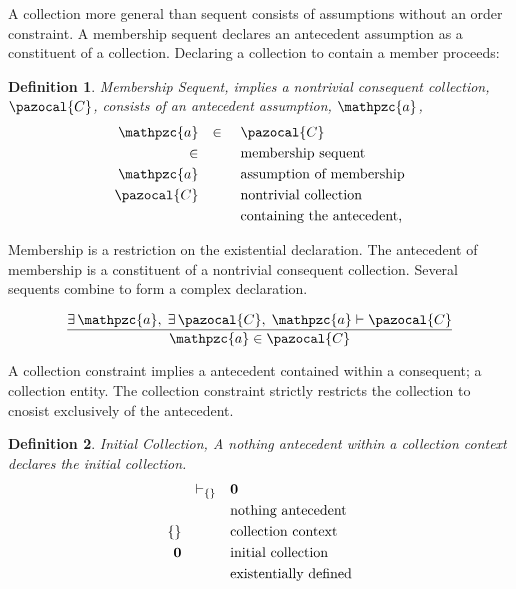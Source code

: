 \documentclass[aps,twocolumn,secnumarabic,nobalancelastpage,amsmath,amssymb,
amsthm,nofootinbib,parskip=full]{revtex4}
\numberwithin{equation}{section}
\newtheorem{definition}{Definition}[section]
\newcommand{\obk}[1]{\mathpzc{#1}}
\newcommand{\cat}[1]{\pazocal{#1}}
\newcommand{\catN}[1]{\mathbf{\large #1}}
\begin{document}
A collection more general than sequent consists of
assumptions without an order constraint.
A membership sequent declares an antecedent assumption as a
constituent of a collection.
Declaring a collection to contain a member proceeds:

\begin{definition}{Membership Sequent}\label{def:membership},
  implies a nontrivial consequent collection, $\cat{C}$,
  consists of an antecedent assumption, $\obk{a}$,
  \begin{equation*}
  \begin{array}{rll}
   \obk{a}&\in&\cat{C} \\[3pt]
   \in&\quad&\text{membership sequent} \\[3pt]
   \obk{a}&\quad&\text{assumption of membership} \\[3pt]
   \cat{C}&\quad&\text{nontrivial collection} \\[3pt]
   &&\text{containing the antecedent,}
  \end{array}
  \end{equation*}
\end{definition}

Membership is a restriction on the existential declaration.
The antecedent of membership is a constituent of a
nontrivial consequent collection.
Several sequents combine to form a complex declaration.

\begin{equation*}
\frac{\exists\,\obk{a},\;\exists\,\cat{C},\;\obk{a}\vdash\cat{C}}
{\obk{a}\in\cat{C}}
\end{equation*}  

A collection constraint implies a antecedent contained within a consequent; a
collection entity. The collection constraint strictly restricts the collection
to cnosist exclusively of the antecedent.

\begin{definition}{Initial Collection}\label{def:initialcollection},
  A nothing antecedent within a collection context declares the
  initial collection.
  \begin{equation*}
  \begin{array}{rll}
   &\vdash_{\{\}}&\catN{0} \\[3pt]
   &\quad&\text{nothing antecedent} \\[3pt]
   \{\}&\quad&\text{collection context} \\[3pt]
   \catN{0}&\quad&\text{initial collection} \\[3pt]
    &&\text{existentially defined}
  \end{array}
  \end{equation*}
\end{definition}
\end{document}
